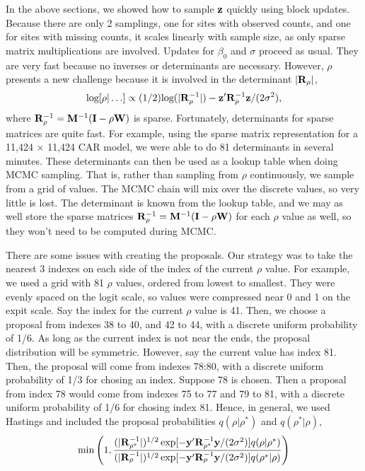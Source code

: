 \documentclass[11pt, titlepage]{article}
\begin{document}
\begin{spacing}{1.9}
\begin{flushleft}
In the above sections, we showed how to sample $\mathbf{z}$ quickly using block updates.  Because there are only 2 samplings, one for sites with observed counts, and one for sites with missing counts, it scales linearly with sample size, as only sparse matrix multiplications are involved.  Updates for $\beta_{0}$ and $\sigma$ proceed as usual.  They are very fast because no inverses or determinants are necessary.  However, $\rho$ presents a new challenge because it is involved in the determinant $|\mathbf{R}_{\rho}|$,
$$
\textrm{log}[\rho|\ldots] \propto (1/2)\textrm{log}(|\mathbf{R}_{\rho}^{-1}|) - \mathbf{z}^{\prime}\mathbf{R}_{\rho}^{-1}\mathbf{z}/(2\sigma^{2}),
$$
where $\mathbf{R}_{\rho}^{-1} = \mathbf{M}^{-1}(\mathbf{I} - \rho\mathbf{W})$ is sparse. Fortunately, determinants for sparse matrices are quite fast. For example, using the sparse matrix representation for a 11,424 $\times$ 11,424 CAR model, we were able to do 81 determinants in several minutes.  These determinants can then be used as a lookup table when doing MCMC sampling.  That is, rather than sampling from $\rho$ continuously, we sample from a grid of values.  The MCMC chain will mix over the discrete values, so very little is lost. The determinant is known from the lookup table, and we may as well store the sparse matrices $\mathbf{R}_{\rho}^{-1}=\mathbf{M}^{-1}(\mathbf{I} - \rho\mathbf{W})$ for each $\rho$ value as well, so they won't need to be computed during MCMC.

There are some issues with creating the proposals.  Our strategy was to take the nearest 3 indexes on each side of the index of the current $\rho$ value.  For example, we used a grid with 81 $\rho$ values, ordered from lowest to smallest.  They were evenly spaced on the logit scale, so values were compressed near 0 and 1 on the expit scale.  Say the index for the current $\rho$ value is 41. Then, we choose a proposal from indexes 38 to 40, and 42 to 44, with a discrete uniform probability of 1/6.  As long as the current index is not near the ends, the proposal distribution will be symmetric.  However, say the current value has index 81.  Then, the proposal will come from indexes 78:80, with a discrete uniform probability of 1/3 for chosing an index.  Suppose 78 is chosen.  Then a proposal from index 78 would come from indexes 75 to 77 and 79 to 81, with a discrete uniform probability of 1/6 for chosing index 81.  Hence, in general, we used Hastings and included the proposal probabilities $q(\rho|\rho^{*})$ and $q(\rho^{*}|\rho)$,
$$
\min\left(1,\frac{(|\mathbf{R}_{\rho^{*}}^{-1}|)^{1/2} \exp[- \mathbf{y}^{\prime}\mathbf{R}_{\rho^{*}}^{-1}\mathbf{y}/(2\sigma^{2})]q(\rho|\rho^{*})}
	{(|\mathbf{R}_{\rho}^{-1}|)^{1/2} \exp[- \mathbf{y}^{\prime}\mathbf{R}_{\rho}^{-1}\mathbf{y}/(2\sigma^{2})]q(\rho^{*}|\rho)}
\right)
$$


\end{flushleft}
\end{spacing}
\end{document}
